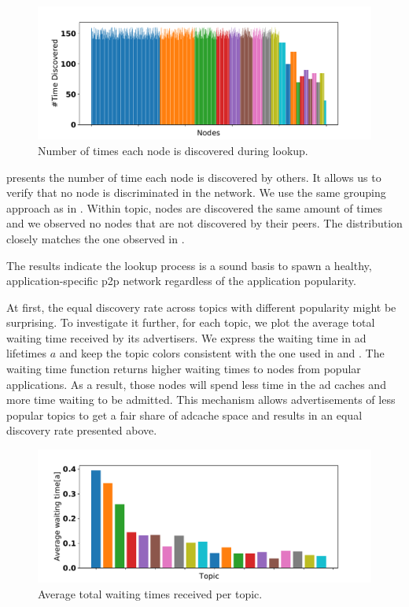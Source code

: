 \begin{figure}
\centering
\includegraphics[width=\linewidth]{results/testbed/testbed_times_discovered.pdf}
\caption{Number of times each node is discovered during lookup.}
\label{fig:testbed_time_discovered}
\vspace{-0.15in}
\end{figure}

 presents the number of time each node is discovered by others. It allows us to verify that no node is discriminated in the network. We use the same grouping approach as in . Within topic, nodes are discovered the same amount of times and we observed no nodes that are not discovered by their peers. The distribution closely matches the one observed in . 

The results indicate the \sysname lookup process is a sound basis to spawn a healthy, application-specific p2p network regardless of the application popularity.

At first, the equal discovery rate across topics with different popularity might be surprising. To investigate it further, for each topic, we plot the average total waiting time received by its advertisers. We express the waiting time in ad lifetimes $a$ and keep the topic colors consistent with the one used in  and \label{fig:testbed_time_discovered}. The waiting time function returns higher waiting times to nodes from popular applications. As a result, those nodes will spend less time in the ad caches and more time waiting to be admitted. This mechanism allows advertisements of less popular topics to get a fair share of adcache space and results in an equal discovery rate presented above. 

\begin{figure}
\centering
\includegraphics[width=\linewidth]{results/testbed/waiting_time.pdf}
\caption{Average total waiting times received per topic.}
\label{fig:testbed_waiting_time}
\vspace{-0.15in}
\end{figure}

